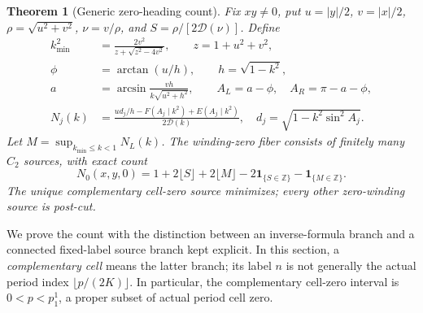\documentclass[11pt,a4paper]{article}
\newtheorem{theorem}{Theorem}[section]
\theoremstyle{remark}\newtheorem{remark}[theorem]{Remark}
\newcommand{\ind}{\mathbf{1}}
\begin{document}
\begin{theorem}[Generic zero-heading count]\label{thm:zero-count}
Fix $xy\ne0$, put $u=|y|/2$, $v=|x|/2$, $\rho=\sqrt{u^2+v^2}$,
$\nu=v/\rho$, and $S=\rho/[2\mathcal D(\nu)]$. Define
\begin{align}
 k_{\min}^2&=\frac{2v^2}{z+\sqrt{z^2-4v^2}},
       \qquad z=1+u^2+v^2,\label{eq:zero-kmin}\\
 \phi&=\arctan(u/h),\qquad h=\sqrt{1-k^2},\nonumber\\
 a&=\arcsin\frac{vh}{k\sqrt{u^2+h^2}},\qquad
 A_L=a-\phi,\quad A_R=\pi-a-\phi,\nonumber\\
 N_j(k)&=\frac{u d_j/h-F(A_j\mid k^2)+E(A_j\mid k^2)}
                    {2\mathcal D(k)},
 \quad d_j=\sqrt{1-k^2\sin^2 A_j}.\label{eq:zero-index}
\end{align}
Let $M=\sup_{k_{\min}\le k<1}N_L(k)$. The winding-zero fiber consists
of finitely many $C_2$ sources, with exact count
\begin{equation}\label{eq:zero-count}
 N_0(x,y,0)=1+2\lfloor S\rfloor+2\lfloor M\rfloor
                   -2\ind_{\{S\in\mathbb Z\}}-\ind_{\{M\in\mathbb Z\}}.
\end{equation}
The unique complementary cell-zero source minimizes; every other
zero-winding source is post-cut.
\end{theorem}

We prove the count with the distinction between an inverse-formula
branch and a connected fixed-label source branch kept explicit.
In this section, a \emph{complementary cell} means the latter branch;
its label $n$ is not generally the actual period index
$\lfloor p/(2K)\rfloor$. In particular, the complementary cell-zero
interval is $0<p<p_1^1$, a proper subset of actual period cell zero.
\end{document}
